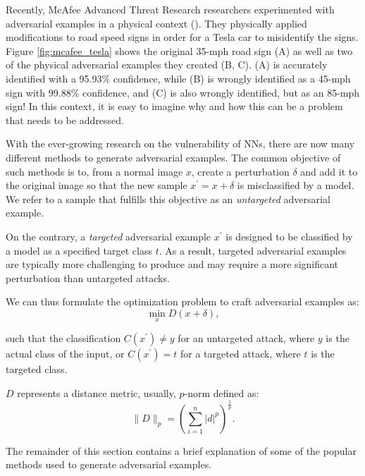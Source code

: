 Recently, McAfee Advanced Threat Research researchers experimented with
adversarial examples in a physical context (\cite{noauthor_model_2020}). They
physically applied modifications to road speed signs in order for a Tesla car to
misidentify the signs. Figure \ref{fig:mcafee_tesla} shows the original 35-mph
road sign (A) as well as two of the physical adversarial examples they created
(B, C). (A) is accurately identified with a 95.93\% confidence, while (B) is
wrongly identified as a 45-mph sign with 99.88\% confidence, and (C) is also
wrongly identified, but as an 85-mph sign! In this context, it is easy to
imagine why and how this can be a problem that needs to be addressed.




With the ever-growing research on the vulnerability of NNs, there are now many
different methods to generate adversarial examples. The common objective of such
methods is to, from a normal image $x$, create a perturbation $\delta$ and add
it to the original image so that the new sample $x^{\prime}=x+\delta$ is
misclassified by a model. We refer to a sample that fulfills this objective as
an \textit{untargeted} adversarial example.

On the contrary, a \textit{targeted} adversarial example $x^{\prime}$ is
designed to be classified by a model as a specified target class $t$. As a
result, targeted adversarial examples are typically more challenging to produce
and may require a more significant perturbation than untargeted attacks.

We can thus formulate the optimization problem to craft adversarial examples as:
\begin{equation} \label{eq:adversarial_example_min}
    \min_{x}D(x+\delta),
\end{equation}


such that the classification $C(x^\prime)\neq{y}$ for an untargeted attack,
where $y$ is the actual class of the input, or $C(x^\prime)={t}$ for a targeted
attack, where $t$ is the targeted class.

$D$ represents a distance metric, usually, $p$-norm defined as:
\begin{equation} \label{eq:p-norm}
    \lVert D
    \lVert_{p}=\left(\sum_{i=1}^{n}|d|^{p}\right)^{\frac{1}{p}}.
\end{equation}

The remainder of this section contains a brief explanation of some of the
popular methods used to generate adversarial examples.


